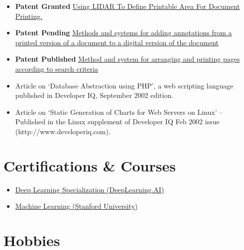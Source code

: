 \documentclass[a4paper,12pt]{article}
\begin{document}
\begin{itemize}
  \setlength\itemsep{-0.5em}

\item
  \textbf{Patent Granted} \textendash
  \href{https://patents.justia.com/patent/20240281181}{Using LIDAR To
    Define Printable Area For Document Printing.}
  
\item
  \textbf{Patent Pending} \textendash
  \href{https://patents.google.com/patent/US20230289515A1}{Methods
    and systems for adding annotations from a printed version of a
    document to a digital version of the document}

\item \textbf{Patent Published} \textendash
  \href{https://patents.google.com/patent/US20190294385A1}{Method and
    system for arranging and printing pages according to search
    criteria}
  
\item Article on `Database Abstraction using PHP', a web scripting
  language published in Developer IQ, September 2002 edition.

\item Article on `Static Generation of Charts for Web Servers on
  Linux' – Published in the Linux supplement of Developer IQ Feb 2002
  issue (http://www.developeriq.com).

\end{itemize}


\section*{Certifications \& Courses}

\begin{itemize}
  
  \setlength\itemsep{-0.5em}
  
\item
  \href{https://www.coursera.org/account/accomplishments/specialization/Y9XD9ZQ3EGG2}{Deep Learning Specialization (DeepLearning.AI)}
  
\item
  \href{https://www.coursera.org/account/accomplishments/verify/2YVCNYET6XSL}{Machine Learning (Stanford University)}
  
\end{itemize}

\section*{Hobbies}

\end{document}
